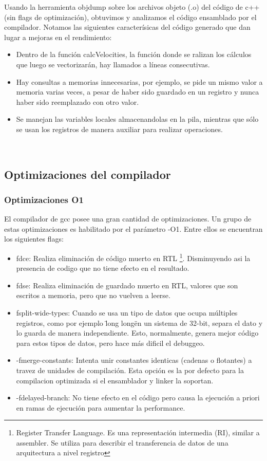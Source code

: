 Usando la herramienta objdump sobre los archivos objeto (.o) del código de c++ (sin flags de optimización), obtuvimos y analizamos el código ensamblado por el compilador. Notamos las siguientes caracterísicas del código generado que dan lugar a mejoras en el rendimiento:
\begin{itemize}
	\item Dentro de la función calcVelocities, la función donde se ralizan los cálculos que luego se vectorizarán, hay llamados a líneas consecutivas.
	\item Hay consultas a memorias innecesarias, por ejemplo, se pide un mismo valor a memoria varias veces, a pesar de haber sido guardado en un registro y nunca haber sido reemplazado con otro valor.
	\item Se manejan las variables locales almacenandolas en la pila, mientras que sólo se usan los registros de manera auxiliar para realizar operaciones.
\end{itemize}


~\\


\subsection{Optimizaciones del compilador}

\subsubsection{Optimizaciones O1}
El compilador de gcc posee una gran cantidad de optimizaciones. Un grupo de estas optimizaciones es habilitado por el parámetro -O1. Entre ellos se encuentran los siguientes flags:


\begin{itemize}
	\item fdce: Realiza eliminación de código muerto en RTL \footnote{Register Transfer Language. Es una representación intermedia (RI), similar a assembler. Se utiliza para describir el transferencia de datos de una arquitectura a nivel registro}. Disminuyendo asi la presencia de codigo que no tiene efecto en el resultado.
	\item fdse: Realiza eliminación de guardado muerto en RTL, valores que son escritos a memoria, pero que no vuelven a leerse.
	\item fsplit-wide-types: Cuando se usa un tipo de datos que ocupa múltiples registros, como por ejemplo \"long long\" en un sistema de 32-bit, separa el dato y lo guarda de manera independiente. Esto, normalmente, genera mejor código para estos tipos de datos, pero hace más dificil el debuggeo.
	\item -fmerge-constants: Intenta unir constantes identicas (cadenas o flotantes) a travez de unidades de compilación. Esta opción es la por defecto para la compilacion optimizada si el ensamblador y linker la soportan.
	\item -fdelayed-branch: No tiene efecto en el código pero causa la ejecución a priori en ramas de ejecución para aumentar la performance.
\end{itemize}

